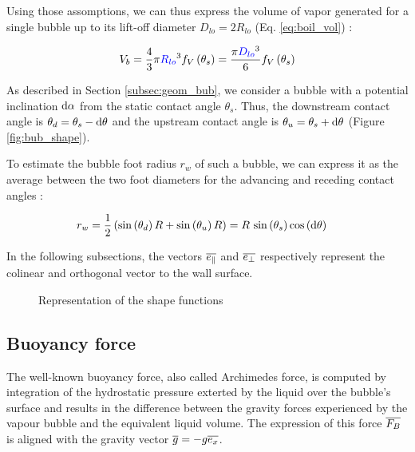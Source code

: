 \npar

Using those assomptions, we can thus express the volume of vapor generated for a single bubble up to its lift-off diameter $D_{lo}=2R_{lo}$ (Eq. \ref{eq:boil_vol}) :

\begin{align}
\label{eq:boil_vol}
V_{b}=\frac{4}{3}\pi \bluemath{R_{lo}}^{3} f_{V}\parth{\theta_{s}} = \frac{\pi \bluemath{D_{lo}}^{3}}{6} f_{V}\parth{\theta_{s}}
\end{align}

As described in Section \ref{subsec:geom_bub}, we consider a bubble with a potential inclination $\text{d}\alpha$ from the static contact angle $\theta_{s}$. Thus, the downstream contact angle is $\theta_{d}=\theta_{s} - \mathrm{d}\theta$ and the upstream contact angle is $\theta_{u}=\theta_{s} + \mathrm{d}\theta$ (Figure \ref{fig:bub_shape}).

\npar

To estimate the bubble foot radius $r_{w}$ of such a bubble, we can express it as the average between the two foot diameters for the advancing and receding contact angles :

\begin{align}
r_{w} &= \frac{1}{2}\left( \mathrm{sin}\left( \theta_{d} \right)R + \mathrm{sin}\left( \theta_{u} \right)R \right) = R~\mathrm{sin}\left( \theta_{s} \right)\mathrm{cos}\left( \mathrm{d}\theta \right)
\end{align}

\npar

In the following subsections, the vectors $\overline{e_{\|}}$ and $\overline{e_{\bot}}$ respectively represent the colinear and orthogonal vector to the wall surface.


\begin{figure}[h!]


\caption{Representation of the shape functions}
\end{figure}


\subsection{Buoyancy force}

The well-known buoyancy force, also called Archimedes force, is computed by integration of the hydrostatic pressure exterted by the liquid over the bubble's surface and results in the difference between the gravity forces experienced by the vapour bubble and the equivalent liquid volume. The expression of this force $\overline{F_{B}}$ is aligned with the gravity vector $\overline{g}=-g\overline{e_{x}}$.

